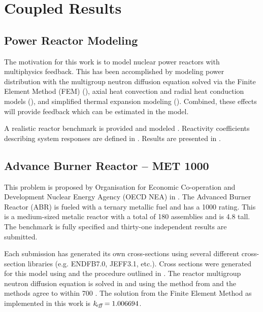\chapter{Coupled Results}
\label{ch:coupledResults}

\section{Power Reactor Modeling}
\label{sec:power_reactor_modeling}
  The motivation for this work is to model nuclear power reactors with
  multiphysics feedback. This has been accomplished by modeling power
  distribution with the multigroup neutron diffusion equation solved via the
  Finite Element Method (FEM) (), axial heat
  convection and radial heat conduction models (),
  and simplified thermal expansion modeling ().
  Combined, these effects will provide feedback which can be estimated in the
  model. 
  
  A realistic reactor benchmark is provided and modeled .
  Reactivity coefficients describing system responses are defined in
  . Results are presented in
  .

\section{Advance Burner Reactor -- MET 1000}
\label{sec:abr}
  This problem is proposed by Organisation for Economic Co-operation and
  Development Nuclear Energy Agency (OECD NEA) in \cite{abr}. The Advanced
  Burner Reactor (ABR) is fueled with a ternary metallic fuel and has a 1000
   rating. This is a medium-sized metalic reactor with a total of
  180 assemblies and is 4.8  tall. The benchmark is fully specified and
  thirty-one independent results are submitted. 
  
  Each submission has generated its own cross-sections using several different
  cross-section libraries (e.g. ENDFB7.0, JEFF3.1, etc.). 
  Cross sections were generated for this model using \mcc and the procedure 
  outlined in . The reactor multigroup 
  neutron diffusion equation is solved in \dif and using the method from
   and the methods agree to within 700 . 
  The solution from the Finite Element Method as implemented in this work is 
  $k_{\!\mbox{\scriptsize \em eff}} = 1.006694$.

